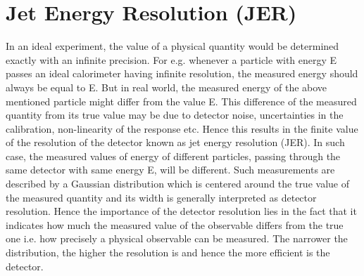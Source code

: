 \section{Jet Energy Resolution (JER)}
\label{sec:Resolution}
In an ideal experiment, the value of a physical quantity would be determined exactly with an infinite precision. For e.g. whenever a particle with energy E passes an ideal calorimeter having infinite resolution, the measured energy should always be equal to E. But in real world, the measured energy of the above mentioned particle might differ from the value E. This difference of the measured quantity from its true value may be due to detector noise, uncertainties in the calibration, non-linearity of the response etc. Hence this results in the finite value of the resolution of the detector known as jet energy resolution (JER). In such case, the measured values of energy of different particles, passing through the same detector with same energy E, will be different. Such measurements are described by a Gaussian distribution which is centered around the true value of the measured quantity and its width is generally interpreted as detector resolution. Hence the importance of the detector resolution lies in the fact that it indicates how much the measured value of the observable differs from the true one i.e. how precisely a physical observable can be measured. The narrower the distribution, the higher the resolution is and hence the more efficient is the detector. %

